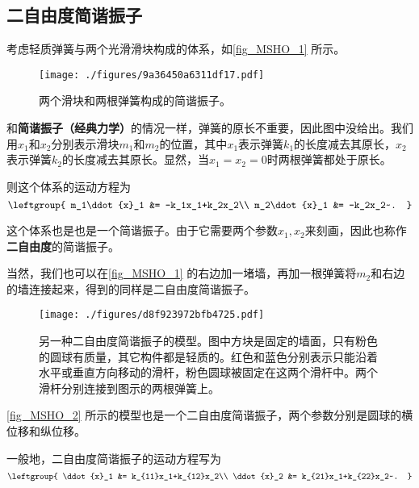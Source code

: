 

\subsection{二自由度简谐振子}

考虑轻质弹簧与两个光滑滑块构成的体系，如\autoref{fig_MSHO_1} 所示。

\begin{figure}[ht]
\centering
\texttt{[image: ./figures/9a36450a6311df17.pdf]}
\caption{两个滑块和两根弹簧构成的简谐振子。} \label{fig_MSHO_1}
\end{figure}

和\textbf{简谐振子（经典力学）}的情况一样，弹簧的原长不重要，因此图中没给出。我们用$x_1$和$x_2$分别表示滑块$m_1$和$m_2$的位置，其中$x_1$表示弹簧$k_1$的长度减去其原长，$x_2$表示弹簧$k_2$的长度减去其原长。显然，当$x_1=x_2=0$时两根弹簧都处于原长。

则这个体系的运动方程为
\begin{equation}
\leftgroup{
    m_1\ddot{x}_1 &= -k_1x_1+k_2x_2\\
    m_2\ddot{x}_1 &= -k_2x_2~.
}
\end{equation}

这个体系也是也是一个简谐振子。由于它需要两个参数$x_1, x_2$来刻画，因此也称作\textbf{二自由度}的简谐振子。

当然，我们也可以在\autoref{fig_MSHO_1} 的右边加一堵墙，再加一根弹簧将$m_2$和右边的墙连接起来，得到的同样是二自由度简谐振子。


\begin{figure}[ht]
\centering
\texttt{[image: ./figures/d8f923972bfb4725.pdf]}
\caption{另一种二自由度简谐振子的模型。图中方块是固定的墙面，只有粉色的圆球有质量，其它构件都是轻质的。红色和蓝色分别表示只能沿着水平或垂直方向移动的滑杆，粉色圆球被固定在这两个滑杆中。两个滑杆分别连接到图示的两根弹簧上。} \label{fig_MSHO_2}
\end{figure}

\autoref{fig_MSHO_2} 所示的模型也是一个二自由度简谐振子，两个参数分别是圆球的横位移和纵位移。

一般地，二自由度简谐振子的运动方程写为
\begin{equation}\label{eq_MSHO_1}
\leftgroup{
    \ddot{x}_1 &= k_{11}x_1+k_{12}x_2\\
    \ddot{x}_2 &= k_{21}x_1+k_{22}x_2~.
}
\end{equation}



